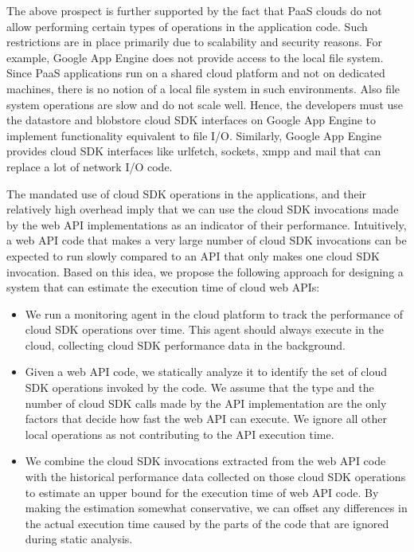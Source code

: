 The above prospect is further supported by the fact that PaaS clouds do not allow 
performing certain types of operations in the application code. Such restrictions are in place
primarily due to scalability and security reasons. For example, Google App Engine
does not provide access to the local file system. Since PaaS applications run on a shared cloud
platform and not on dedicated machines, there is no notion of a local file system in such environments.
Also file system operations are slow and do not scale well.
Hence, the developers must use the datastore and blobstore cloud SDK interfaces on Google App
Engine to implement functionality equivalent to file I/O. Similarly, Google App Engine provides cloud SDK
interfaces like urlfetch, sockets, xmpp and mail that can replace a lot of network I/O code.

The mandated use of cloud SDK operations in the applications, and their relatively high overhead 
imply that we can use the cloud SDK
invocations made by the web API implementations as an indicator of their performance. Intuitively, a web API
code that makes a very large number of cloud SDK invocations can be expected to run slowly compared
to an API that only makes one cloud SDK invocation. Based on this idea, we propose the following approach
for designing a system that can estimate the execution time of cloud web APIs:

\begin{itemize}
\item We run a monitoring agent in the cloud platform to track the performance of
cloud SDK operations over time. This agent should always execute in the cloud, collecting
cloud SDK performance data in the background.
\item Given a web API code, we statically analyze it to identify the set of cloud SDK operations
invoked by the code. We assume that the type and the number of cloud SDK calls made by the API implementation
are the only factors that decide how fast the web API can execute. We ignore all other local operations
as not contributing to the API execution time.
\item We combine the cloud SDK invocations extracted from the web API code with the historical
performance data collected on those cloud SDK operations to estimate an upper bound for the
execution time of web API code. By making the estimation somewhat conservative, we can offset 
any differences in the actual execution time caused by the parts of the code that are ignored during
static analysis. 
\end{itemize}

